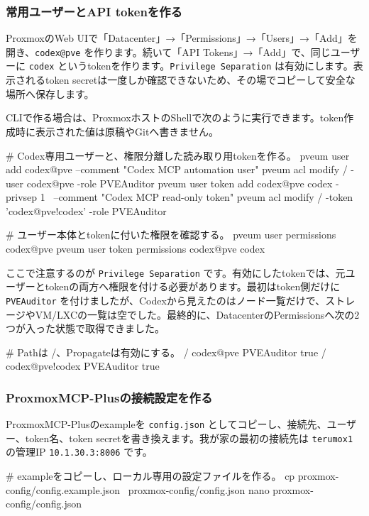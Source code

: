 \subsubsection*{常用ユーザーとAPI tokenを作る}

ProxmoxのWeb UIで「Datacenter」→「Permissions」→「Users」→「Add」を開き、\texttt{codex@pve} を作ります。続いて「API Tokens」→「Add」で、同じユーザーに \texttt{codex} というtokenを作ります。\texttt{Privilege Separation} は有効にします。表示されるtoken secretは一度しか確認できないため、その場でコピーして安全な場所へ保存します。

CLIで作る場合は、ProxmoxホストのShellで次のように実行できます。token作成時に表示された値は原稿やGitへ書きません。

\begin{commands}
# Codex専用ユーザーと、権限分離した読み取り用tokenを作る。
pveum user add codex@pve --comment "Codex MCP automation user"
pveum acl modify / -user codex@pve -role PVEAuditor
pveum user token add codex@pve codex -privsep 1 \
  --comment "Codex MCP read-only token"
pveum acl modify / -token 'codex@pve!codex' -role PVEAuditor

# ユーザー本体とtokenに付いた権限を確認する。
pveum user permissions codex@pve
pveum user token permissions codex@pve codex
\end{commands}

ここで注意するのが \texttt{Privilege Separation} です。有効にしたtokenでは、元ユーザーとtokenの両方へ権限を付ける必要があります。最初はtoken側だけに \texttt{PVEAuditor} を付けましたが、Codexから見えたのはノード一覧だけで、ストレージやVM/LXCの一覧は空でした。最終的に、DatacenterのPermissionsへ次の2つが入った状態で取得できました。

\begin{commands}
# Pathは /、Propagateは有効にする。
/  codex@pve        PVEAuditor  true
/  codex@pve!codex  PVEAuditor  true
\end{commands}

\subsubsection*{ProxmoxMCP-Plusの接続設定を作る}

ProxmoxMCP-Plusのexampleを \texttt{config.json} としてコピーし、接続先、ユーザー、token名、token secretを書き換えます。我が家の最初の接続先は \texttt{terumox1} の管理IP \texttt{10.1.30.3:8006} です。

\begin{commands}
# exampleをコピーし、ローカル専用の設定ファイルを作る。
cp proxmox-config/config.example.json \
  proxmox-config/config.json
nano proxmox-config/config.json
\end{commands}

